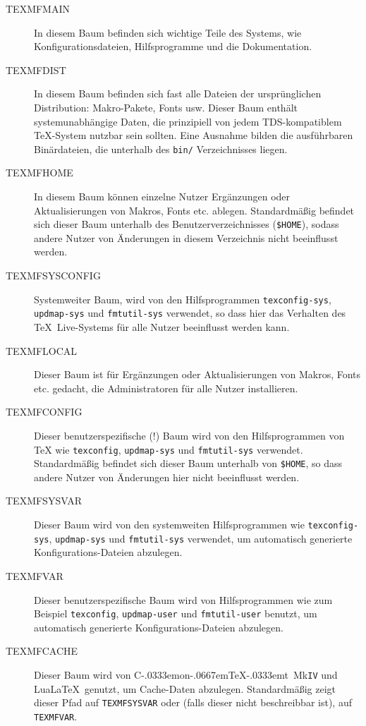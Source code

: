 \documentclass[12pt,ngerman,a4paper,fullparskip]{report}
\newcommand{\TL}{\TeX\ Live\xspace}
\newcommand{\acro}[1]{\texttt{#1}}
\newcommand{\code}[1]{\texttt{#1}}
\newcommand\ConTeXt{C\kern-.0333emon\-\kern-.0667em\TeX\kern-.0333emt}
\begin{document}
\begin{description}
\item [TEXMFMAIN] In diesem Baum befinden sich wichtige Teile des Systems,
  wie Konfigurationsdateien, Hilfsprogramme und die Dokumentation.
\item [TEXMFDIST] In diesem Baum befinden sich fast alle Dateien der ursprünglichen Distribution: Makro-Pakete, Fonts usw. Dieser Baum enthält systemunabhängige Daten, die prinzipiell
  von jedem TDS-kompatiblem \TeX-System nutzbar sein sollten. Eine Ausnahme bilden die ausführbaren Binärdateien, die unterhalb des \code{bin/} Verzeichnisses liegen. 
\item [TEXMFHOME] In diesem Baum können einzelne Nutzer Ergänzungen oder
  Aktualisierungen von Makros, Fonts etc. ablegen. Standardmäßig befindet
  sich dieser Baum unterhalb des Benutzerverzeichnisses (\verb+$HOME+), sodass andere Nutzer von Änderungen in diesem Verzeichnis nicht beeinflusst werden.
\item [TEXMFSYSCONFIG] Systemweiter Baum, wird von den Hilfsprogrammen
  \verb+texconfig-sys+, \verb+updmap-sys+ und \verb+fmtutil-sys+
  verwendet, so dass hier das Verhalten des \TL-Systems für alle Nutzer
  beeinflusst werden kann.
\item [TEXMFLOCAL] Dieser Baum ist für Ergänzungen oder Aktualisierungen
  von Makros, Fonts etc. gedacht, die Administratoren für alle Nutzer
  installieren.
\item [TEXMFCONFIG] Dieser benutzerspezifische (!) Baum wird von den Hilfsprogrammen von \TeX{}
  wie \verb+texconfig+, \verb+updmap-sys+ und \verb+fmtutil-sys+ verwendet.
  Standardmäßig befindet sich dieser Baum unterhalb von \verb+$HOME+,
  so dass andere Nutzer von Änderungen hier nicht beeinflusst werden.
\item [TEXMFSYSVAR] Dieser Baum wird von den systemweiten Hilfsprogrammen
  wie \verb+texconfig-sys+, \verb+updmap-sys+ und \verb+fmtutil-sys+
  verwendet, um automatisch generierte Konfigurations-Dateien abzulegen.
\item [TEXMFVAR] Dieser benutzerspezifische Baum wird von Hilfsprogrammen wie zum Beispiel \verb+texconfig+,
  \verb+updmap-user+ und \verb+fmtutil-user+ benutzt, um automatisch generierte
  Konfigurations-Dateien abzulegen.
\item [TEXMFCACHE] Dieser Baum wird von \ConTeXt\ Mk\acro{IV} und Lua\LaTeX\ genutzt, um Cache-Daten abzulegen. Standardmäßig zeigt dieser Pfad auf \code{TEXMFSYSVAR} oder (falls dieser nicht beschreibbar ist), auf \code{TEXMFVAR}.
\end{description}
\end{document}
